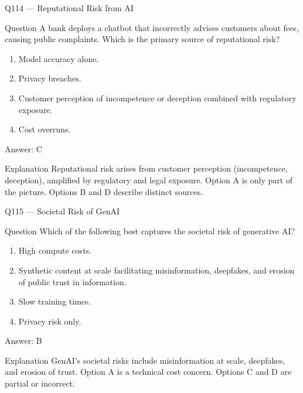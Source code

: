 \documentclass[aspectratio=169,8pt]{beamer}
\begin{document}
\begin{frame}{Q114 --- Reputational Risk from AI}
\begin{block}{Question}
A bank deploys a chatbot that incorrectly advises customers about fees, causing public complaints. Which is the primary source of reputational risk?
\end{block}
\begin{enumerate}
\item Model accuracy alone.
\item Privacy breaches.
\item Customer perception of incompetence or deception combined with regulatory exposure.
\item Cost overruns.
\end{enumerate}
\begin{exampleblock}{Answer: C}\end{exampleblock}
\begin{block}{Explanation}
Reputational risk arises from customer perception (incompetence, deception), amplified by regulatory and legal exposure. Option A is only part of the picture. Options B and D describe distinct sources.
\end{block}
\end{frame}

\begin{frame}{Q115 --- Societal Risk of GenAI}
\begin{block}{Question}
Which of the following best captures the societal risk of generative AI?
\end{block}
\begin{enumerate}
\item High compute costs.
\item Synthetic content at scale facilitating misinformation, deepfakes, and erosion of public trust in information.
\item Slow training times.
\item Privacy risk only.
\end{enumerate}
\begin{exampleblock}{Answer: B}\end{exampleblock}
\begin{block}{Explanation}
GenAI's societal risks include misinformation at scale, deepfakes, and erosion of trust. Option A is a technical cost concern. Options C and D are partial or incorrect.
\end{block}
\end{frame}
\end{document}
